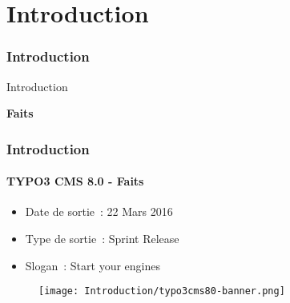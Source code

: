 %

\section{Introduction}
\begin{frame}[fragile]
	\frametitle{Introduction}

	\begin{center}\huge{Introduction}\end{center}
	\begin{center}\huge{\color{typo3darkgrey}\textbf{Faits}}\end{center}

\end{frame}

\begin{frame}[fragile]
	\frametitle{Introduction}
	\framesubtitle{TYPO3 CMS 8.0 - Faits}

	\begin{itemize}
		\item Date de sortie~: 22 Mars 2016
		\item Type de sortie~: Sprint Release
		\item Slogan~: Start your engines
	\end{itemize}

	\begin{figure}
		\texttt{[image: Introduction/typo3cms80-banner.png]}
	\end{figure}

\end{frame}

